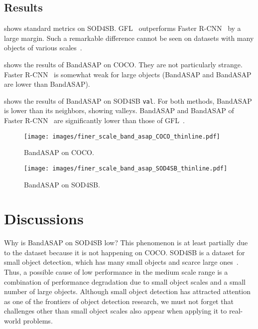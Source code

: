 \documentclass{mva_style}
\begin{document}
\subsection{Results}

 shows standard metrics on SOD4SB.
GFL~\cite{GFL_NeurIPS2020} outperforms Faster R-CNN~\cite{Faster_R-CNN_NIPS2015} by a large margin.
Such a remarkable difference cannot be seen on datasets with many objects of various scales~\cite{USB_Shinya_BMVC2022}.

 shows the results of BandASAP on COCO.
They are not particularly strange.
Faster R-CNN~\cite{Faster_R-CNN_NIPS2015} is somewhat weak for large objects
(BandASAP and BandASAP are lower than BandASAP).

 shows the results of BandASAP on SOD4SB \texttt{val}.
For both methods, BandASAP is lower than its neighbors, showing valleys.
BandASAP and BandASAP of Faster R-CNN~\cite{Faster_R-CNN_NIPS2015} are significantly lower than those of GFL~\cite{GFL_NeurIPS2020}.


\begin{figure}[t]
	\centering
	\texttt{[image: images/finer\_scale\_band\_asap\_COCO\_thinline.pdf]}
	\vspace{-8mm}
	\caption{
		BandASAP on COCO.
	}
	\label{fig:band_asap_coco}
\end{figure}

\begin{figure}[t]
	\centering
	\texttt{[image: images/finer\_scale\_band\_asap\_SOD4SB\_thinline.pdf]}
	\vspace{-8mm}
	\caption{
		BandASAP on SOD4SB.
	}
	\label{fig:band_asap_sod4sb}
\end{figure}



\section{Discussions}
\label{sec:discussions}

Why is BandASAP on SOD4SB low?
This phenomenon is at least partially due to the dataset because it is not happening on COCO.
SOD4SB is a dataset for small object detection, which has many small objects and scarce large ones~\cite{SOD4SB_MVA2023_challenge}.
Thus, a possible cause of low performance in the medium scale range is
a combination of performance degradation due to small object scales and a small number of large objects.
Although small object detection has attracted attention as one of the frontiers of object detection research,
we must not forget that challenges other than small object scales also appear when applying it to real-world problems.
\end{document}
